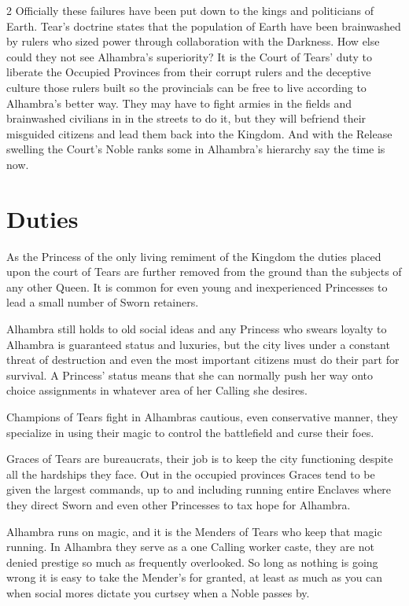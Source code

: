 \begin{multicols}{2}
Officially these failures have been put down to the kings and politicians of Earth. Tear's doctrine states that the population of Earth have been brainwashed by rulers who sized power through collaboration with the Darkness. How else could they not see Alhambra's superiority? It is the Court of Tears' duty to liberate the Occupied Provinces from their corrupt rulers and the deceptive culture those rulers built so the provincials can be free to live according to Alhambra's better way. They may have to fight armies in the fields and brainwashed civilians in in the streets to do it, but they will befriend their misguided citizens and lead them back into the Kingdom. And with the Release swelling the Court's Noble ranks some in Alhambra's hierarchy say the time is now. 

\section*{Duties}

As the Princess of the only living remiment of the Kingdom the duties placed upon the court of Tears are further removed from the ground than the subjects of any other Queen. It is common for even young and inexperienced Princesses to lead a small number of Sworn retainers. 

Alhambra still holds to old social ideas and any Princess who swears loyalty to Alhambra is guaranteed status and luxuries, but the city lives under a constant threat of destruction and even the most important citizens must do their part for survival. A Princess' status means that she can normally push her way onto choice assignments in whatever area of her Calling she desires. 

Champions of Tears fight in Alhambras cautious, even conservative manner, they specialize in using their magic to control the battlefield and curse their foes. 

Graces of Tears are bureaucrats, their job is to keep the city functioning despite all the hardships they face. Out in the occupied provinces Graces tend to be given the largest commands, up to and including running entire Enclaves where they direct Sworn and even other Princesses to tax hope for Alhambra. 

Alhambra runs on magic, and it is the Menders of Tears who keep that magic running. In Alhambra they serve as a one Calling worker caste, they are not denied prestige so much as frequently overlooked. So long as nothing is going wrong it is easy to take the Mender's for granted, at least as much as you can when social mores dictate you curtsey when a Noble passes by. 


\end{multicols}
